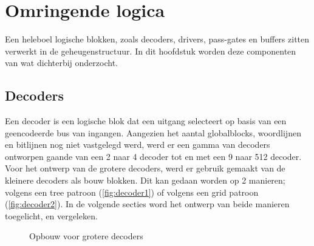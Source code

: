 \chapter{Omringende logica}
\label{periphery}

Een heleboel logische blokken, zoals decoders, drivers, pass-gates en buffers zitten verwerkt in de geheugenstructuur.
In dit hoofdstuk worden deze componenten van wat dichterbij onderzocht.

\section{Decoders}
Een decoder is een logische blok dat een uitgang selecteert op basis van een geencodeerde bus van ingangen. Aangezien het aantal globalblocks, woordlijnen en bitlijnen nog niet vastgelegd werd, werd er een gamma van decoders ontworpen gaande van een 2 naar 4 decoder tot en met een 9 naar 512 decoder. Voor het ontwerp van de grotere decoders, werd er gebruik gemaakt van de kleinere decoders als bouw blokken. Dit kan gedaan worden op 2 manieren; volgens een tree patroon (\ref{fig:decoder1}) of volgens een grid patroon (\ref{fig:decoder2}). In de volgende secties word het ontwerp van beide manieren toegelicht, en vergeleken.

\begin{figure}[!ht]
\centering
{}
\caption{Opbouw voor grotere decoders}\label{fig:basisdecoders}
\end{figure}

